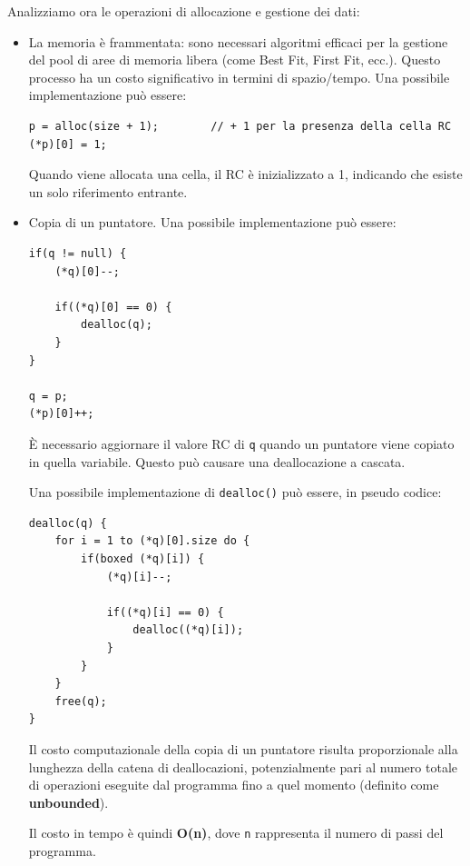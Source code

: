 \documentclass{article}
\begin{document}
\vspace{14pt}
Analizziamo ora le operazioni di allocazione e gestione dei dati:
\begin{itemize}
    \item La memoria è frammentata: sono necessari algoritmi efficaci per la gestione del pool di aree di memoria libera (come Best Fit, First Fit, ecc.). Questo processo ha un costo significativo in termini di spazio/tempo. Una possibile implementazione può essere:
    
\begin{tcolorbox}
\begin{verbatim}
p = alloc(size + 1);        // + 1 per la presenza della cella RC
(*p)[0] = 1;
\end{verbatim}
\end{tcolorbox}

    Quando viene allocata una cella, il RC è inizializzato a 1, indicando che esiste un solo riferimento entrante.
    \item Copia di un puntatore. Una possibile implementazione può essere:

\begin{tcolorbox}
\begin{verbatim}
if(q != null) {
    (*q)[0]--;

    if((*q)[0] == 0) {
        dealloc(q);
    }
}

q = p;
(*p)[0]++;
\end{verbatim}
\end{tcolorbox}

    È necessario aggiornare il valore RC di \texttt{q} quando un puntatore viene copiato in quella variabile. Questo può causare una deallocazione a cascata.
    
    Una possibile implementazione di \texttt{dealloc()} può essere, in pseudo codice:
\begin{tcolorbox}
\begin{verbatim}
dealloc(q) {
    for i = 1 to (*q)[0].size do {
        if(boxed (*q)[i]) {
            (*q)[i]--;

            if((*q)[i] == 0) {
                dealloc((*q)[i]);
            }
        }
    }
    free(q);
}
\end{verbatim}
\end{tcolorbox}

    Il costo computazionale della copia di un puntatore risulta proporzionale alla lunghezza della catena di deallocazioni, potenzialmente pari al numero totale di operazioni eseguite dal programma fino a quel momento (definito come \textbf{unbounded}).

    Il costo in tempo è quindi \textbf{O(n)}, dove \texttt{n} rappresenta il numero di passi del programma.
\end{itemize}
\end{document}
